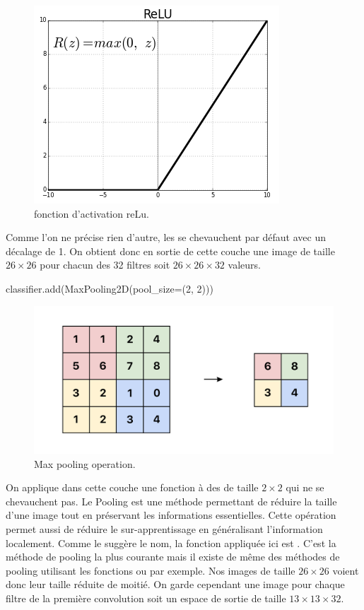 \begin{figure}[h]
  \centering
  \includegraphics[scale=0.35]{assets/reLu}
  \caption{fonction d'activation reLu.}
  \label{fig:reLu}
\end{figure}

Comme l'on ne précise rien d'autre, les  se chevauchent par défaut avec un 
décalage de 1. 
On obtient donc en sortie de cette couche une image de taille $26 \times 26$ pour 
chacun des 32 filtres soit $26 \times 26 \times 32$ valeurs.

\begin{codeblock}
classifier.add(MaxPooling2D(pool_size=(2, 2)))
\end{codeblock}

\begin{figure}[h]
  \centering
  \includegraphics[scale=0.2]{assets/pooling}
  \caption{Max pooling operation.}
  \label{fig:pooling}
\end{figure}

On applique dans cette couche une fonction à des  de taille $2 \times 2$ 
qui ne se chevauchent pas. 
Le Pooling est une méthode permettant de réduire la taille d'une image tout en préservant 
les informations essentielles. Cette opération permet aussi de réduire le 
sur-apprentissage en généralisant l'information localement.
Comme le suggère le nom, la fonction appliquée ici est . C'est la méthode
de pooling la plus courante mais il existe de même des méthodes de pooling utilisant 
les fonctions  ou  par exemple. 
Nos images de taille $26 \times 26$ voient donc leur taille réduite de moitié. 
On garde cependant une image pour chaque filtre de la première convolution 
soit un espace de sortie de taille $13 \times 13 \times 32$.

